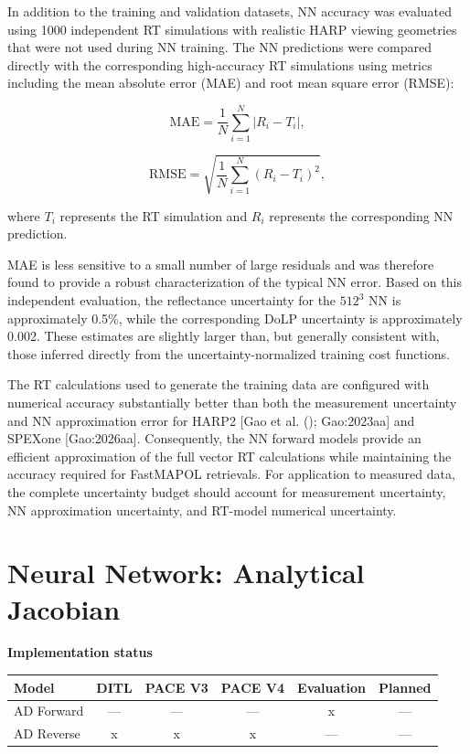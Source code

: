\documentclass[
  11pt,
  letterpaper,
]{scrreprt}
\begin{document}
In addition to the training and validation datasets, NN accuracy was
evaluated using 1000 independent RT simulations with realistic HARP
viewing geometries that were not used during NN training. The NN
predictions were compared directly with the corresponding high-accuracy
RT simulations using metrics including the mean absolute error (MAE) and
root mean square error (RMSE):

\[
\mathrm{MAE}
=
\frac{1}{N}
\sum_{i=1}^{N}
\left|R_i-T_i\right|,
\]

\[
\mathrm{RMSE}
=
\sqrt{
\frac{1}{N}
\sum_{i=1}^{N}
\left(R_i-T_i\right)^2
},
\]

where \(T_i\) represents the RT simulation and \(R_i\) represents the
corresponding NN prediction.

MAE is less sensitive to a small number of large residuals and was
therefore found to provide a robust characterization of the typical NN
error. Based on this independent evaluation, the reflectance uncertainty
for the \(512^3\) NN is approximately 0.5\%, while the corresponding
DoLP uncertainty is approximately 0.002. These estimates are slightly
larger than, but generally consistent with, those inferred directly from
the uncertainty-normalized training cost functions.

The RT calculations used to generate the training data are configured
with numerical accuracy substantially better than both the measurement
uncertainty and NN approximation error for HARP2 {[}Gao et al.
(); Gao:2023aa{]} and SPEXone
{[}Gao:2026aa{]}. Consequently, the NN forward models provide an
efficient approximation of the full vector RT calculations while
maintaining the accuracy required for FastMAPOL retrievals. For
application to measured data, the complete uncertainty budget should
account for measurement uncertainty, NN approximation uncertainty, and
RT-model numerical uncertainty.

\chapter{Neural Network: Analytical Jacobian}\label{sec-nn-ad}

\textbf{Implementation status}

\begin{longtable}[]{@{}lccccc@{}}
\toprule\noalign{}
Model & DITL & PACE V3 & PACE V4 & Evaluation & Planned \\
\midrule\noalign{}
\endhead
\bottomrule\noalign{}
\endlastfoot
AD Forward & --- & --- & --- & x & --- \\
AD Reverse & x & x & x & --- & --- \\
\end{longtable}
\end{document}
